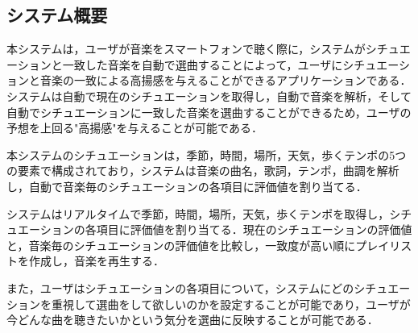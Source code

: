 \subsection{システム概要}
\par
本システムは，ユーザが音楽をスマートフォンで聴く際に，システムがシチュエーションと一致した音楽を自動で選曲することによって，ユーザにシチュエーションと音楽の一致による高揚感を与えることができるアプリケーションである．システムは自動で現在のシチュエーションを取得し，自動で音楽を解析，そして自動でシチュエーションに一致した音楽を選曲することができるため，ユーザの予想を上回る"高揚感"を与えることが可能である．
\par
本システムのシチュエーションは，季節，時間，場所，天気，歩くテンポの5つの要素で構成されており，システムは音楽の曲名，歌詞，テンポ，曲調を解析し，自動で音楽毎のシチュエーションの各項目に評価値を割り当てる．
\par
システムはリアルタイムで季節，時間，場所，天気，歩くテンポを取得し，シチュエーションの各項目に評価値を割り当てる．現在のシチュエーションの評価値と，音楽毎のシチュエーションの評価値を比較し，一致度が高い順にプレイリストを作成し，音楽を再生する．
\par
また，ユーザはシチュエーションの各項目について，システムにどのシチュエーションを重視して選曲をして欲しいのかを設定することが可能であり，ユーザが今どんな曲を聴きたいかという気分を選曲に反映することが可能である．
